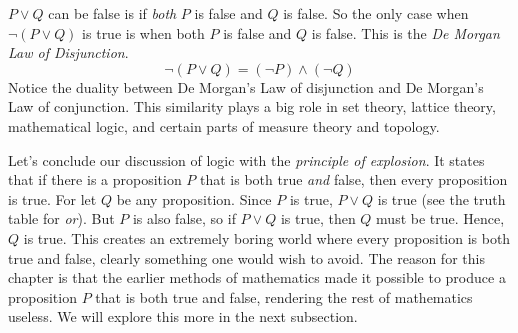             $P\lor{Q}$ can be false is if \textit{both} $P$ is false and $Q$ is
            false. So the only case when $\neg(P\lor{Q})$ is true is when both
            $P$ is false and $Q$ is false. This is the
            \textit{De Morgan Law of Disjunction}.%
            \begin{equation}
                \neg(P\lor{Q})=(\neg{P})\land(\neg{Q})
            \end{equation}
            Notice the duality between De Morgan's Law of disjunction and
            De Morgan's Law of conjunction. This similarity plays a big role
            in set theory, lattice theory, mathematical logic, and certain
            parts of measure theory and topology.
            \par\hfill\par
            Let's conclude our discussion of logic with the
            \textit{principle of explosion}.%
            It states that if there is a
            proposition $P$ that is both true \textit{and} false, then every
            proposition is true. For let $Q$ be any proposition. Since $P$ is
            true, $P\lor{Q}$ is true (see the truth table for \textit{or}). But
            $P$ is also false, so if $P\lor{Q}$ is true, then $Q$ must be true.
            Hence, $Q$ is true. This creates an extremely boring world where
            every proposition is both true and false, clearly something one
            would wish to avoid. The reason for this chapter is that the earlier
            methods of mathematics made it possible to produce a proposition
            $P$ that is both true and false, rendering the rest of mathematics
            useless. We will explore this more in the next subsection.
